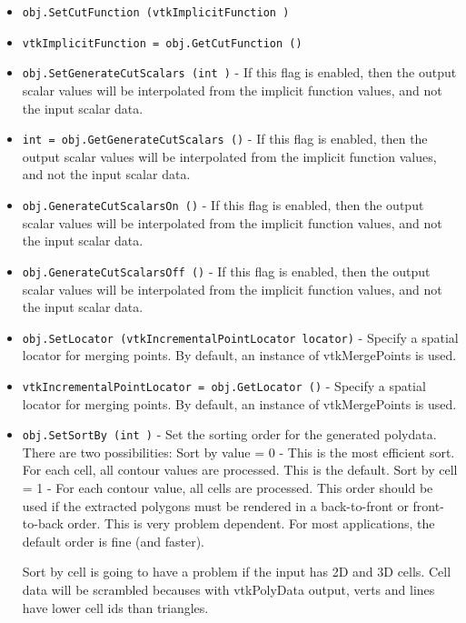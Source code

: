 \begin{itemize}
\item  \verb|obj.SetCutFunction (vtkImplicitFunction )|

\item  \verb|vtkImplicitFunction = obj.GetCutFunction ()|

\item  \verb|obj.SetGenerateCutScalars (int )| -  If this flag is enabled, then the output scalar values will be
 interpolated from the implicit function values, and not the input scalar
 data.

\item  \verb|int = obj.GetGenerateCutScalars ()| -  If this flag is enabled, then the output scalar values will be
 interpolated from the implicit function values, and not the input scalar
 data.

\item  \verb|obj.GenerateCutScalarsOn ()| -  If this flag is enabled, then the output scalar values will be
 interpolated from the implicit function values, and not the input scalar
 data.

\item  \verb|obj.GenerateCutScalarsOff ()| -  If this flag is enabled, then the output scalar values will be
 interpolated from the implicit function values, and not the input scalar
 data.

\item  \verb|obj.SetLocator (vtkIncrementalPointLocator locator)| -  Specify a spatial locator for merging points. By default, 
 an instance of vtkMergePoints is used.

\item  \verb|vtkIncrementalPointLocator = obj.GetLocator ()| -  Specify a spatial locator for merging points. By default, 
 an instance of vtkMergePoints is used.

\item  \verb|obj.SetSortBy (int )| -  Set the sorting order for the generated polydata. There are two
 possibilities:
   Sort by value = 0 - This is the most efficient sort. For each cell,
      all contour values are processed. This is the default.
   Sort by cell = 1 - For each contour value, all cells are processed.
      This order should be used if the extracted polygons must be rendered
      in a back-to-front or front-to-back order. This is very problem 
      dependent.
 For most applications, the default order is fine (and faster).

 Sort by cell is going to have a problem if the input has 2D and 3D cells.
 Cell data will be scrambled becauses with 
 vtkPolyData output, verts and lines have lower cell ids than triangles.


\end{itemize}
